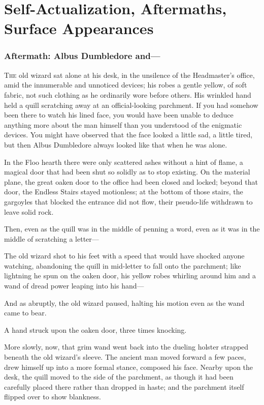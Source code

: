\chapter{Self-Actualization, Aftermaths, Surface Appearances}

\subsection{Aftermath: Albus Dumbledore and—}

\lettrine{T}{he} old wizard sat alone at his desk, in the unsilence of the Headmaster's
office, amid the innumerable and unnoticed devices; his robes a gentle yellow,
of soft fabric, not such clothing as he ordinarily wore before others. His
wrinkled hand held a quill scratching away at an official-looking parchment. If
you had somehow been there to watch his lined face, you would have been unable
to deduce anything more about the man himself than you understood of the
enigmatic devices. You might have observed that the face looked a little sad, a
little tired, but then Albus Dumbledore always looked like that when he was
alone.

In the Floo hearth there were only scattered ashes without a hint of flame, a
magical door that had been shut so solidly as to stop existing. On the material
plane, the great oaken door to the office had been closed and locked; beyond
that door, the Endless Stairs stayed motionless; at the bottom of those stairs,
the gargoyles that blocked the entrance did not flow, their pseudo-life
withdrawn to leave solid rock.

Then, even as the quill was in the middle of penning a word, even as it was in
the middle of scratching a letter—

The old wizard shot to his feet with a speed that would have shocked anyone
watching, abandoning the quill in mid-letter to fall onto the parchment; like
lightning he spun on the oaken door, his yellow robes whirling around him and a
wand of dread power leaping into his hand—

And as abruptly, the old wizard paused, halting his motion even as the wand
came to bear.

A hand struck upon the oaken door, three times knocking.

More slowly, now, that grim wand went back into the dueling holster strapped
beneath the old wizard's sleeve. The ancient man moved forward a few paces,
drew himself up into a more formal stance, composed his face. Nearby upon the
desk, the quill moved to the side of the parchment, as though it had been
carefully placed there rather than dropped in haste; and the parchment itself
flipped over to show blankness.

